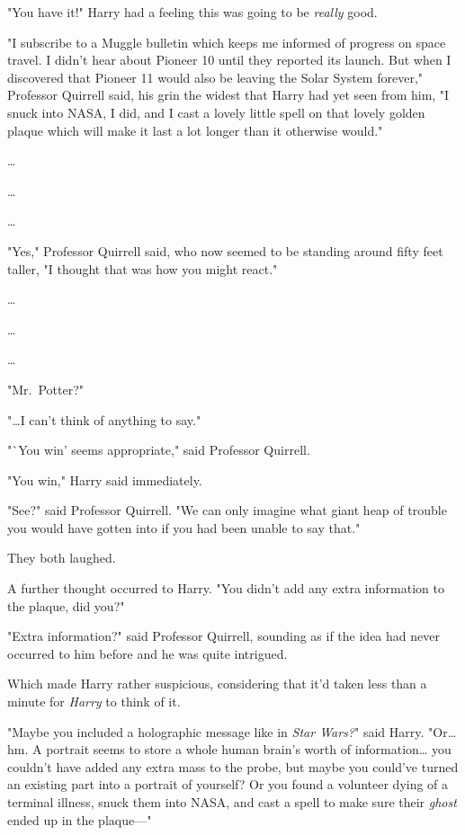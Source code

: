 "You have it!" Harry had a feeling this was going to be \emph{really} good.

"I subscribe to a Muggle bulletin which keeps me informed of progress on space
travel. I didn't hear about Pioneer 10 until they reported its launch. But when
I discovered that Pioneer 11 would also be leaving the Solar System forever,"
Professor Quirrell said, his grin the widest that Harry had yet seen from him,
"I snuck into NASA, I did, and I cast a lovely little spell on that lovely
golden plaque which will make it last a lot longer than it otherwise would."

{\ldots}

{\ldots}

{\ldots}

"Yes," Professor Quirrell said, who now seemed to be standing around fifty feet
taller, "I thought that was how you might react."

{\ldots}

{\ldots}

{\ldots}

"Mr.~Potter?"

"{\ldots}I can't think of anything to say."

"`You win' seems appropriate," said Professor Quirrell.

"You win," Harry said immediately.

"See?" said Professor Quirrell. "We can only imagine what giant heap of trouble
you would have gotten into if you had been unable to say that."

They both laughed.

A further thought occurred to Harry. "You didn't add any extra information to
the plaque, did you?"

"Extra information?" said Professor Quirrell, sounding as if the idea had never
occurred to him before and he was quite intrigued.

Which made Harry rather suspicious, considering that it'd taken less than a
minute for \emph{Harry} to think of it.

"Maybe you included a holographic message like in \emph{Star Wars?}" said
Harry. "Or{\ldots} hm. A portrait seems to store a whole human brain's worth of
information{\ldots} you couldn't have added any extra mass to the probe, but
maybe you could've turned an existing part into a portrait of yourself? Or you
found a volunteer dying of a terminal illness, snuck them into NASA, and cast a
spell to make sure their \emph{ghost} ended up in the plaque---"

